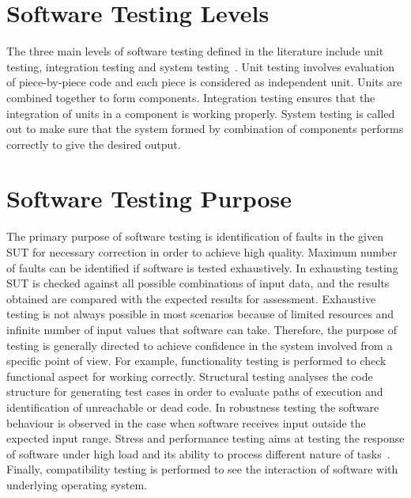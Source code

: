 \section{Software Testing Levels}
The three main levels of software testing defined in the literature include unit testing, integration testing and system testing~\cite{chilenski1994applicability}. Unit testing involves evaluation of piece-by-piece code and each piece is considered as independent unit. Units are combined together to form components. Integration testing ensures that the integration of units in a component is working properly. System testing is called out to make sure that the system formed by combination of components performs correctly to give the desired output.

\section{Software Testing Purpose}
The primary purpose of software testing is identification of faults in the given SUT for necessary correction in order to achieve high quality. Maximum number of faults can be identified if software is tested exhaustively. In exhausting testing SUT is checked against all possible combinations of input data, and the results obtained are compared with the expected results for assessment. Exhaustive testing is not always possible in most scenarios because of limited resources and infinite number of input values that software can take. Therefore, the purpose of testing is generally directed to achieve confidence in the system involved from a specific point of view. For example, functionality testing is performed to check functional aspect for working correctly. Structural testing analyses the code structure for generating test cases in order to evaluate paths of execution and identification of unreachable or dead code. In robustness testing the software behaviour is observed in the case when software receives input outside the expected input range. Stress and performance testing aims at testing the response of software under high load and its ability to process different nature of tasks~\cite{cohen2005robustness}. Finally, compatibility testing is performed to see the interaction of software with underlying operating system.

